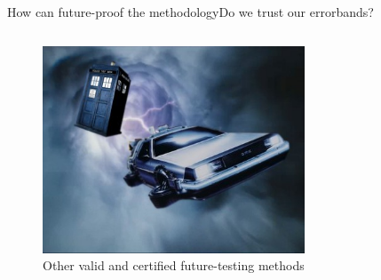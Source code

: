 \begin{frame}{How can future-proof the methodology}{Do we trust our errorbands?}
\begin{columns}
        \vspace{-1.9cm}
        \begin{figure}
            \captionsetup{format=smol}
            \includegraphics[width=0.7\textwidth]{juan_future_hyperopt/tardisdelorean.jpg}
            \caption{\tiny Other valid and certified future-testing methods}
        \end{figure}
    \end{columns}



\end{frame}


